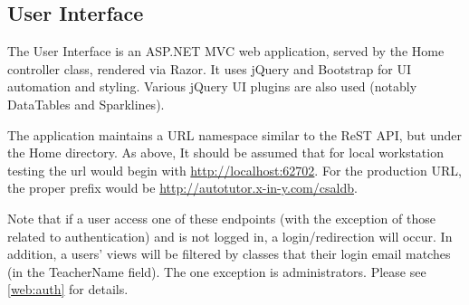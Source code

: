 \documentclass[letterpaper,10pt]{article}
\newcommand{\fullxref}[1]{ \ref{#1} \nameref{#1} }
\begin{document}
\subsection{User Interface}
\label{web:gui}
The User Interface is an ASP.NET MVC web application, served by the Home controller
class, rendered via Razor.  It uses jQuery and Bootstrap for UI automation
and styling.  Various jQuery UI plugins are also used (notably DataTables and
Sparklines).

The application maintains a URL namespace similar to the ReST API, but under
the Home directory.  As above, It should be assumed that for local
workstation testing the url would begin with \url{http://localhost:62702}.  For
the production URL, the proper prefix would be 
\url{http://autotutor.x-in-y.com/csaldb}.

Note that if a user access one of these endpoints (with the exception of those
related to authentication) and is not logged in, a login/redirection will occur.
In addition, a users' views will be filtered by classes that their login email
matches (in the TeacherName field).  The one exception is administrators. Please
see \fullxref{web:auth} for details.
\end{document}
